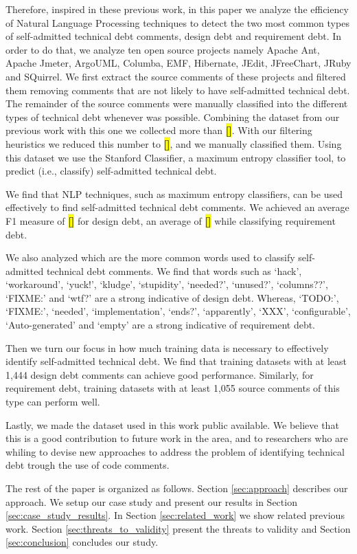 \documentclass{sig-alternate}
\newcommand{\todo}[1]{\colorbox{yellow}{\textbf{[#1]}}}
\newcommand{\SATD}{self-admitted technical debt\xspace}
\begin{document}
Therefore, inspired in these previous work, in this paper we analyze the efficiency of Natural Language Processing techniques to detect the two most common types of \SATD comments, design debt and requirement debt. In order to do that, we analyze ten open source projects namely Apache Ant, Apache Jmeter, ArgoUML, Columba, EMF, Hibernate, JEdit, JFreeChart, JRuby and SQuirrel. We first extract the source comments of these projects and filtered them removing comments that are not likely to have \SATD. The remainder of the source comments were manually classified into the different types of technical debt whenever was possible. Combining the dataset from our previous work with this one we collected more than \todo{}. With our filtering heuristics we reduced this number to \todo{}, and we manually classified them. Using this dataset we use the Stanford Classifier, a maximum entropy classifier tool, to predict (i.e., classify) \SATD.

We find that NLP techniques, such as maximum entropy classifiers, can be used effectively to find \SATD comments. We achieved an average F1 measure of \todo{} for design debt, an average of \todo{} while classifying requirement debt. 

We also analyzed which are the more common words used to classify \SATD comments. We find that words such as `hack', `workaround', `yuck!', `kludge', `stupidity', `needed?', `unused?', `columns??', `FIXME:' and `wtf?' are a strong indicative of design debt. Whereas, `TODO:', `FIXME:', `needed', `implementation', `ends?', `apparently', `XXX', `configurable', `Auto-generated' and `empty' are a strong indicative of requirement debt.

Then we turn our focus in how much training data is necessary to effectively identify \SATD. We find that training datasets with at least 1,444 design debt comments can achieve good performance. Similarly, for requirement debt, training datasets with at least 1,055 source comments of this type can perform well.  

Lastly, we made the dataset used in this work public available. We believe that this is a good contribution to future work in the area, and to researchers who are whiling to devise new approaches to address the problem of identifying technical debt trough the use of code comments.

The rest of the paper is organized as follows. Section \ref{sec:approach} describes our approach. We setup our case study and present our
results in Section \ref{sec:case_study_results}. In Section \ref{sec:related_work} we show related previous work. Section \ref{sec:threats_to_validity} present the threats to validity and Section \ref{sec:conclusion} concludes our study.  
%
\end{document}
